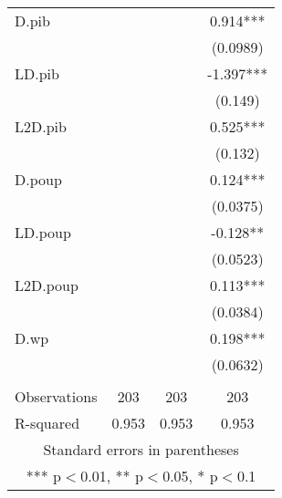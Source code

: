 \begin{tabular}{lccc}
D.pib &  &  & 0.914*** \\
 &  &  & (0.0989) \\
LD.pib &  &  & -1.397*** \\
 &  &  & (0.149) \\
L2D.pib &  &  & 0.525*** \\
 &  &  & (0.132) \\
D.poup &  &  & 0.124*** \\
 &  &  & (0.0375) \\
LD.poup &  &  & -0.128** \\
 &  &  & (0.0523) \\
L2D.poup &  &  & 0.113*** \\
 &  &  & (0.0384) \\
D.wp &  &  & 0.198*** \\
 &  &  & (0.0632) \\
 &  &  &  \\
Observations & 203 & 203 & 203 \\
 R-squared & 0.953 & 0.953 & 0.953 \\ \hline
\multicolumn{4}{c}{ Standard errors in parentheses} \\
\multicolumn{4}{c}{ *** p$<$0.01, ** p$<$0.05, * p$<$0.1} \\
\end{tabular}

